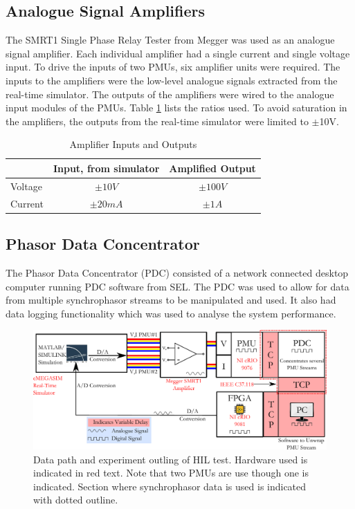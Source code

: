 \documentclass[conference]{IEEEtran}
\begin{document}
\subsection{Analogue Signal Amplifiers}
The SMRT1 Single Phase Relay Tester \cite{Megger} from Megger was used as an analogue signal amplifier. Each individual amplifier had a single current and single voltage input. To drive the inputs of two PMUs, six amplifier units were required. The inputs to the amplifiers were the low-level analogue signals extracted from the real-time simulator. The outputs of the amplifiers were wired to the analogue input modules of the PMUs. Table \ref{AmplifierTable} lists the ratios used. To avoid saturation in the amplifiers, the outputs from the real-time simulator were limited to $\pm$10V. 

\begin{table}[!ht]
\caption{Amplifier Inputs and Outputs}\label{AmplifierTable}
\begin{center}
\begin{tabular}{|l|c|c|}
\hline \textbf{} & \textbf{Input, from simulator} & \textbf{Amplified Output} \\
\hline Voltage &$\pm10V$&$\pm 100V$\\ 
\hline Current & $\pm 20mA$ & $\pm 1A$\\ 
\hline 
\end{tabular}
\end{center}
\end{table} 

\subsection{Phasor Data Concentrator}
The Phasor Data Concentrator (PDC) consisted of a network connected desktop computer running PDC software from SEL. The PDC was used to allow for data from multiple synchrophasor streams to be manipulated and used. It also had data logging functionality which was used to analyse the system performance.

\begin{figure}[!th]
\centering
\includegraphics[width=6in]{DelaySources.pdf} 
\caption{Data path and experiment outling of HIL test. Hardware used is indicated in {\color{red}red} text. Note that two PMUs are use though one is indicated. Section where synchrophasor data is used is indicated with dotted outline.}
\label{ExperimentOutline}
\end{figure}
\end{document}
